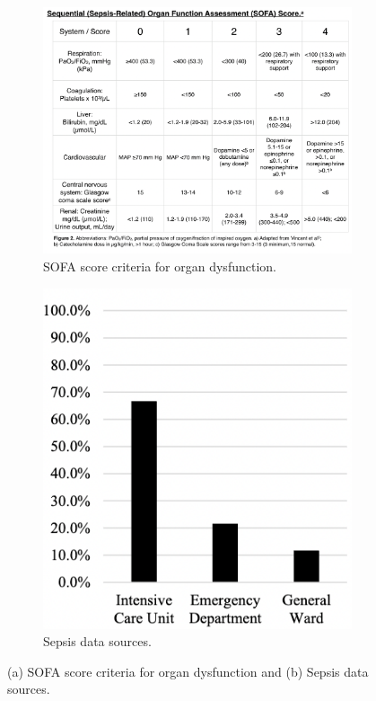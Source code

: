 \begin{figure}[h]
    \centering
    \begin{subfigure}{0.5\textwidth}
        \centering
        \includegraphics[width=\textwidth]{images/sofa.png}
        \caption{SOFA score criteria for organ dysfunction.}
        \label{fig:sofa}
    \end{subfigure}%
    \hfill
    \begin{subfigure}{0.5\textwidth}
        \centering
        \includegraphics[width=\textwidth,height=0.25\textheight,keepaspectratio]{images/sepsis_datasources.png}
        \caption{Sepsis data sources.}
        \label{fig:sepsis_datasources}
    \end{subfigure}
    \caption{(a) SOFA score criteria for organ dysfunction and (b) Sepsis data sources.}
\end{figure}

